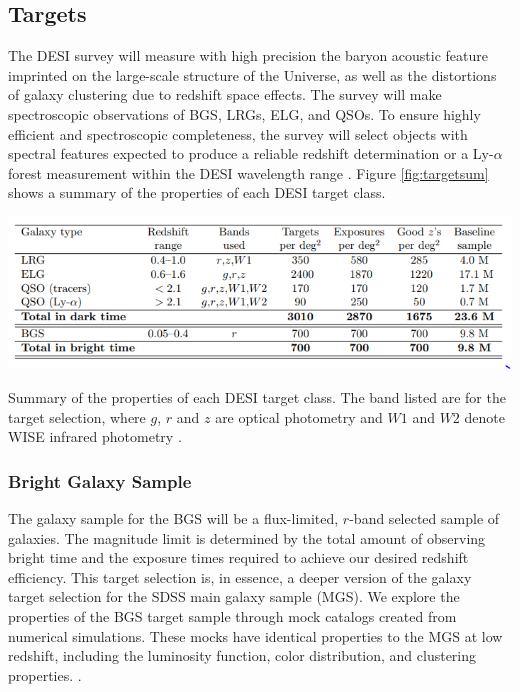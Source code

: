 \subsection{Targets}
The DESI survey will measure with high precision the baryon acoustic feature imprinted on the large-scale structure of the Universe, as well as the distortions of galaxy clustering due to redshift space effects. The survey will make spectroscopic observations of BGS, LRGs, ELG, and QSOs. To ensure highly efficient and spectroscopic completeness, the survey will select objects with spectral features expected to produce a reliable redshift determination or a Ly-$\alpha$ forest measurement within the DESI wavelength range \cite{Aghamousa:2016zmz}. Figure \ref{fig:targetsum} shows a summary of the properties of each DESI target class. 
\begin{table}[h!]
	\centering
	\includegraphics[width=1\linewidth]{TeX_files/Imagenes/target_sum}
	\caption{Summary of the properties of each DESI target class. The band listed are for the target selection, where $g$, $r$ and $z$ are optical photometry and $W1$ and $W2$ denote WISE infrared photometry \cite{Aghamousa:2016zmz}.}
	\label{fig:targetsum}    
\end{table}
\subsubsection{Bright Galaxy Sample}
The galaxy sample for the BGS will be a flux-limited, $r$-band selected sample of galaxies. The
magnitude limit is determined by the total amount of observing bright time and the exposure
times required to achieve our desired redshift efficiency. This target selection is, in essence, a
deeper version of the galaxy target selection for the SDSS main galaxy sample (MGS). We explore
the properties of the BGS target sample through mock catalogs created from numerical simulations.
These mocks have identical properties to the MGS at low redshift, including the luminosity function, color distribution, and clustering properties. \cite{Aghamousa:2016zmz}.
